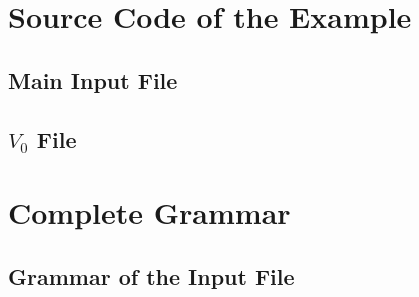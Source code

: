 \documentclass[a4paper,10pt]{article}
\newcommand{\FichierImitator}[1]{
  \lstset{language=Imitator}
  
}
\begin{document}



\newpage

\appendix

\section{Source Code of the Example} \label{app:source}

\subsection{Main Input File}

\FichierImitator{include/SRlatch.imi}



\subsection{$V_0$ File}

\FichierImitator{include/SRlatch.v0}



\newpage

\section{Complete Grammar} \label{app:grammar}


\subsection{Grammar of the Input File}
\end{document}
